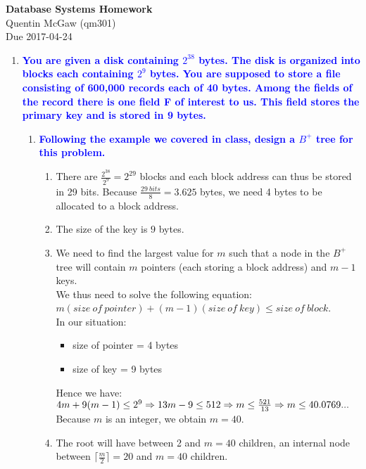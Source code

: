 \documentclass[10pt]{article}
\begin{document}
\begin{center} {\Large\bf Database Systems Homework} \\ Quentin McGaw (qm301) \\ Due 2017-04-24
\end{center}

\begin{enumerate}
\item \textbf{\textcolor{blue}{You are given a disk containing $2^{38}$ bytes. The disk is organized into blocks each containing $2^9$ bytes. You are supposed to store a file consisting of 600,000 records each of 40 bytes. Among the fields of the record there is one field F of interest to us. This field stores the primary key and is stored in 9 bytes.}}
    \begin{enumerate}
        \item \textbf{\textcolor{blue}{Following the example we covered in class, design a $B^+$ tree for this problem.}}
            \begin{enumerate}
                \item There are $ \frac{2^{38}}{2^9} = 2^{29}$ blocks and each block address can thus be stored in 29 bits. Because $\frac{29\ bits}{8} = 3.625$ bytes, we need 4 bytes to be allocated to a block address.
                \item The size of the key is $9$ bytes.
                \item We need to find the largest value for $m$ such that a node in the $B^+$ tree will contain $m$ pointers (each storing a block address) and $m-1$ keys.
                \\ We thus need to solve the following equation: $m(size\ of\ pointer) + (m-1)(size\ of\ key) \leq size\ of\ block$.
                \\ In our situation:
                \begin{itemize}
                    \item size of pointer = 4 bytes
                    \item size of key = 9 bytes
                \end{itemize}
                Hence we have:
                \\ $4m + 9(m-1) \leq 2^9 
                \\ \Rightarrow 13m - 9 \leq 512 \Rightarrow m \leq \frac{521}{13} \Rightarrow m \leq 40.0769...$
                \\ Because $m$ is an integer, we obtain $m = 40$.
                \item The root will have between 2 and $m = 40$ children, an internal node between ${\lceil}\frac{m}{2}{\rceil} = 20$ and $m = 40$ children.

\end{enumerate}
\end{enumerate}
\end{enumerate}
\end{document}
